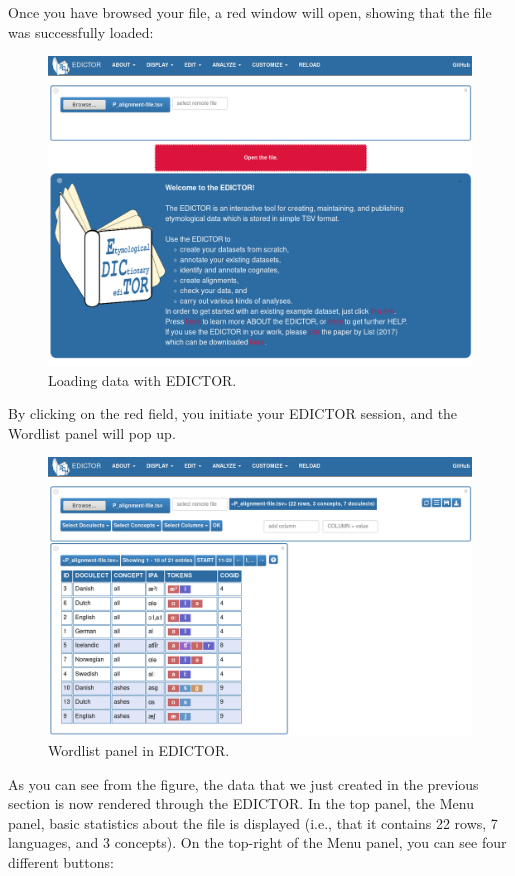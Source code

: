 \documentclass[a4paper,svgnames]{scrartcl}
\begin{document}
Once you have browsed your file, a red window will open, showing that
the file was successfully loaded:

\begin{figure}
\centering
\includegraphics{images/figure-2.png}
\caption{Loading data with EDICTOR.}
\end{figure}

By clicking on the red field, you initiate your EDICTOR session, and the
Wordlist panel will pop up.

\begin{figure}
\centering
\includegraphics{images/figure-3.png}
\caption{Wordlist panel in EDICTOR.}
\end{figure}

As you can see from the figure, the data that we just created in the
previous section is now rendered through the EDICTOR. In the top panel,
the Menu panel, basic statistics about the file is displayed (i.e., that
it contains 22 rows, 7 languages, and 3 concepts). On the top-right of
the Menu panel, you can see four different buttons:
\end{document}
